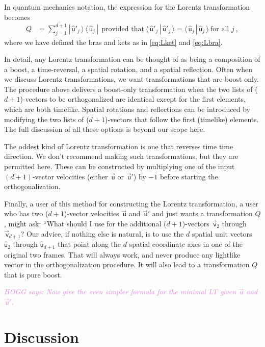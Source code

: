 \documentclass{article}
\newcommand\upvec[1]{\!\vec{\,\mathrm{#1}}}
\newcommand{\Lvec}[1]{\upvec{\mathsf{#1}}} %
\newcommand{\Lhat}[1]{\hat{\mathsf{#1}}} %
\newcommand{\braket}[2]{\langle\,{#1}\,|\,{#2}\,\rangle}
\newcommand{\ketbra}[2]{|\,{#1}\,\rangle\,\langle\,{#2}\,|}
\newcommand{\plus}{\!+\!} %
\newcommand{\HOGG}[1]{\textcolor{violet}{\textsl{HOGG says: {#1}}}}
\begin{document}
In quantum mechanics notation, the expression for the Lorentz transformation becomes
\begin{align}
    Q &= \sum_{j=1}^{d+1} \ketbra{\Lhat{u}'_j}{\Lhat{u}_j} ~~ \mbox{provided that} ~ \braket{\Lhat{u}'_j}{\Lhat{u}'_j} = \braket{\Lhat{u}_j}{\Lhat{u}_j} ~ \mbox{for all $j$} ~,
\end{align}
where we have defined the bras and kets as in \eqref{eq:Lket} and \eqref{eq:Lbra}.

In detail, any Lorentz transformation can be thought of as being a composition of a boost, a time-reversal, a spatial rotation, and a spatial reflection.
Often when we discuss Lorentz transformations, we want transformations that are boost only.
The procedure above delivers a boost-only transformation when the two lists of ($d\plus1$)-vectors to be orthogonalized are identical except for the first elements, which are both timelike.
Spatial rotations and reflections can be introduced by modifying the two lists of ($d\plus1$)-vectors that follow the first (timelike) elements.
The full discussion of all these options is beyond our scope here.

The oddest kind of Lorentz transformation is one that reverses time time direction.
We don't recommend making such transformations, but they are permitted here.
These can be constructed by multiplying one of the input $(d+1)$-vector velocities (either $\Lvec{u}$ or $\Lvec{u}'$) by $-1$ before starting the orthogonalization.

Finally, a user of this method for constructing the Lorentz transformation, a user who has two ($d\plus1$)-vector velocities $\Lvec{u}$ and $\Lvec{u}'$ and just wants a transformation $Q$, might ask: ``What should I use for the additional ($d\plus1$)-vectors $\Lvec{v}_2$ through $\Lvec{v}_{d+1}$?
Our advice, if nothing else is natural, is to use the $d$ spatial unit vectors $\Lhat{u}_2$ through $\Lhat{u}_{d+1}$ that point along the $d$ spatial coordinate axes in one of the original two frames.
That will always work, and never produce any lightlike vector in the orthogonalization procedure.
It will also lead to a transformation $Q$ that is pure boost.

\HOGG{Now give the even simpler formula for the minimal LT given $\Lvec{u}$ and $\Lvec{u}'$.}

\section{Discussion}\label{sec:discussion}
\end{document}
